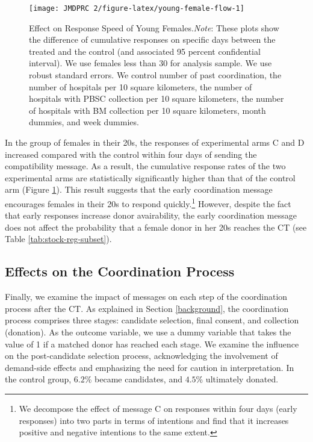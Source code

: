 \documentclass[12pt, a4paper]{article}
\begin{document}
\begin{figure}[t]
\texttt{[image: JMDPRC~2/figure-latex/young-female-flow-1]} \caption{Effect on Response Speed of Young Females.\newline \emph{Note}: These plots show the difference of cumulative responses on specific days between the treated and the control (and associated 95 percent confidential interval). We use females less than 30 for analysis sample. We use robust standard errors. We control number of past coordination, the number of hospitals per 10 square kilometers, the number of hospitals with PBSC collection per 10 square kilometers, the number of hospitals with BM collection per 10 square kilometers, month dummies, and week dummies.}\label{fig:young-female-flow}
\end{figure}

In the group of females in their 20s, the responses of experimental arms C and D increased compared with the control within four days of sending the compatibility message. As a result, the cumulative response rates of the two experimental arms are statistically significantly higher than that of the control arm (Figure \ref{fig:young-female-flow}). This result suggests that the early coordination message encourages females in their 20s to respond quickly.\footnote{We decompose the effect of message C on responses within four days (early responses) into two parts in terms of intentions and find that it increases positive and negative intentions to the same extent.} However, despite the fact that early responses increase donor avairability, the early coordination message does not affect the probability that a female donor in her 20s reaches the CT (see Table \ref{tab:stock-reg-subset}).

\hypertarget{process}{%
\subsection{Effects on the Coordination Process}\label{process}}

Finally, we examine the impact of messages on each step of the coordination process after the CT. As explained in Section \ref{background}, the coordination process comprises three stages: candidate selection, final consent, and collection (donation). As the outcome variable, we use a dummy variable that takes the value of 1 if a matched donor has reached each stage. We examine the influence on the post-candidate selection process, acknowledging the involvement of demand-side effects and emphasizing the need for caution in interpretation. In the control group, \(6.2\)\% became candidates, and \(4.5\)\% ultimately donated.
\end{document}
